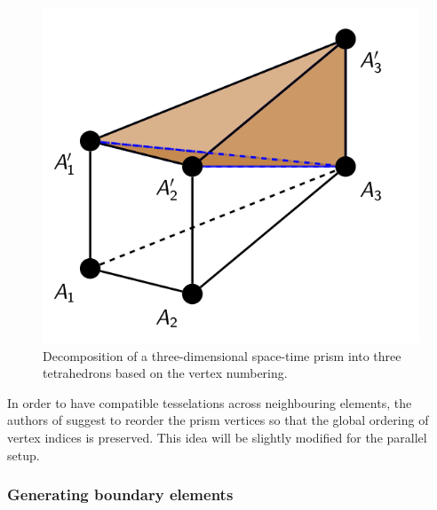\documentclass[12pt]{article}
\begin{document}
\begin{figure}[h]
\begin{minipage}{0.3\textwidth}
\centering
\includegraphics[width = 1.0\textwidth]{third_tetra_prism.png}
\end{minipage}
\caption{Decomposition of a three-dimensional space-time prism into three tetrahedrons based on the vertex numbering.}
\end{figure}


In order to have compatible tesselations across neighbouring elements, the authors of \cite{NeumuellerMeshgen}  suggest to reorder the prism vertices so that the global ordering of vertex indices is preserved. This idea will be slightly modified for the parallel setup.

\subsubsection{Generating boundary elements}
\end{document}
